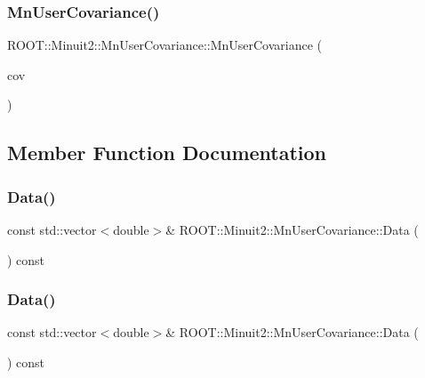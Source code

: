 \subsubsection{\texorpdfstring{MnUserCovariance()}{MnUserCovariance()}\hspace{0.1cm}{\footnotesize\ttfamily [8/8]}}
{\footnotesize\ttfamily R\+O\+O\+T\+::\+Minuit2\+::\+Mn\+User\+Covariance\+::\+Mn\+User\+Covariance (\begin{DoxyParamCaption}\item[{const \mbox{\hyperlink{classROOT_1_1Minuit2_1_1MnUserCovariance}{Mn\+User\+Covariance}} \&}]{cov }\end{DoxyParamCaption})\hspace{0.3cm}{\ttfamily [inline]}}



\subsection{Member Function Documentation}
\mbox{\label{classROOT_1_1Minuit2_1_1MnUserCovariance_a796819e63a5a1a80373a7be0cd764f2e}} 
\subsubsection{\texorpdfstring{Data()}{Data()}\hspace{0.1cm}{\footnotesize\ttfamily [1/2]}}
{\footnotesize\ttfamily const std\+::vector$<$double$>$\& R\+O\+O\+T\+::\+Minuit2\+::\+Mn\+User\+Covariance\+::\+Data (\begin{DoxyParamCaption}{ }\end{DoxyParamCaption}) const\hspace{0.3cm}{\ttfamily [inline]}}

\mbox{\label{classROOT_1_1Minuit2_1_1MnUserCovariance_a796819e63a5a1a80373a7be0cd764f2e}} 
\subsubsection{\texorpdfstring{Data()}{Data()}\hspace{0.1cm}{\footnotesize\ttfamily [2/2]}}
{\footnotesize\ttfamily const std\+::vector$<$double$>$\& R\+O\+O\+T\+::\+Minuit2\+::\+Mn\+User\+Covariance\+::\+Data (\begin{DoxyParamCaption}{ }\end{DoxyParamCaption}) const\hspace{0.3cm}{\ttfamily [inline]}}


